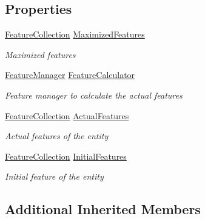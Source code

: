 \subsection*{Properties}
\begin{DoxyCompactItemize}
\item 
\hyperlink{class_hel_project_1_1_features_1_1_feature_collection}{Feature\+Collection} \hyperlink{class_hel_project_1_1_game_world_1_1_entities_1_1_h_entity_afb7fd74a8073bf8311bceba415e6022c}{Maximized\+Features}
\begin{DoxyCompactList}\small\item\em Maximized features \end{DoxyCompactList}\item 
\hyperlink{class_hel_project_1_1_features_1_1_feature_manager}{Feature\+Manager} \hyperlink{class_hel_project_1_1_game_world_1_1_entities_1_1_h_entity_a80aaee359bc963011a0f34c1f27aa47c}{Feature\+Calculator}
\begin{DoxyCompactList}\small\item\em Feature manager to calculate the actual features \end{DoxyCompactList}\item 
\hyperlink{class_hel_project_1_1_features_1_1_feature_collection}{Feature\+Collection} \hyperlink{class_hel_project_1_1_game_world_1_1_entities_1_1_h_entity_ad2f5977677a00f45a3402f11391e8282}{Actual\+Features}
\begin{DoxyCompactList}\small\item\em Actual features of the entity \end{DoxyCompactList}\item 
\hyperlink{class_hel_project_1_1_features_1_1_feature_collection}{Feature\+Collection} \hyperlink{class_hel_project_1_1_game_world_1_1_entities_1_1_h_entity_a155d3d12d931e900e26d770c120ec361}{Initial\+Features}
\begin{DoxyCompactList}\small\item\em Initial feature of the entity \end{DoxyCompactList}\end{DoxyCompactItemize}
\subsection*{Additional Inherited Members}



